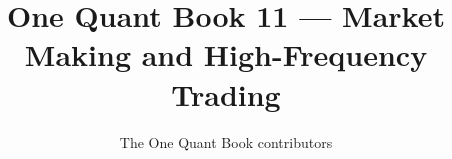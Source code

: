 \documentclass[11pt,a4paper,twoside,openany]{book}
\title{One Quant Book 11 --- Market Making and High-Frequency Trading}
\author{The One Quant Book contributors}
\date{\bookdate}
\begin{document}
\frontmatter



\tableofcontents

\mainmatter


\appendix
\part{\omsolutionspart}


\backmatter
\printindex
\end{document}
